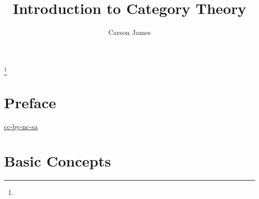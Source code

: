 \documentclass{book}
\begin{document}
	
	\frontmatter
	
	\title{Introduction to Category Theory}
	
	
	\author{Carson James}
	\thanks{}
	
	\date{}
	
	\maketitle
	
	
	\setcounter{page}{4}
	
	\tableofcontents
	\printunsrtglossary[type=symbols,style=long,title={Notation}]
	
	
	\mainmatter
	
	\chapter*{Preface}
	
	\begin{flushleft}
		\href{https://creativecommons.org/licenses/by-nc-sa/4.0/legalcode.txt}{cc-by-nc-sa}
	\end{flushleft}

	\newpage
	
	
	
	
	
	
	
	
	
	
	
	
	
	
	
	
	\chapter{Basic Concepts}
	
\end{document}
